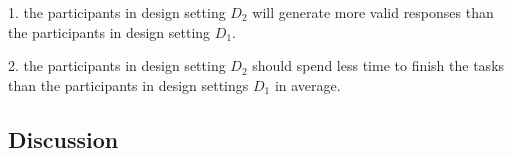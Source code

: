 1. the participants in design setting $D_2$ will generate more valid responses than the participants in design setting $D_1$.

2. the participants in design setting $D_2$ should spend less time to finish the tasks than the participants in design settings $D_1$ in average.

\subsection{Discussion}







 

